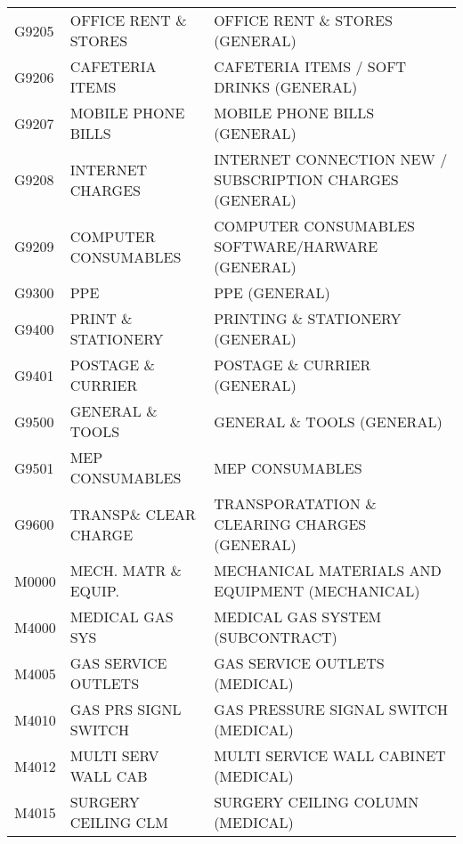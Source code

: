 \begin{longtable}[l]{l%
                  l|%
                  l|}
\rowcolor{thetableheadbgcolor!0.25!white} G9205       & OFFICE RENT \& STORES   & OFFICE RENT \& STORES (GENERAL)   \\
\rowcolor{thetableheadbgcolor!0.25!white} G9206       & CAFETERIA ITEMS   & CAFETERIA ITEMS / SOFT DRINKS (GENERAL)   \\
\rowcolor{thetableheadbgcolor!0.25!white} G9207       & MOBILE PHONE BILLS   & MOBILE PHONE BILLS (GENERAL)   \\
\rowcolor{thetableheadbgcolor!0.25!white} G9208       & INTERNET CHARGES   & INTERNET CONNECTION NEW / SUBSCRIPTION CHARGES  (GENERAL)   \\
\rowcolor{thetableheadbgcolor!0.25!white} G9209       & COMPUTER CONSUMABLES   & COMPUTER CONSUMABLES SOFTWARE/HARWARE (GENERAL)   \\
\rowcolor{thetableheadbgcolor!0.25!white} G9300       & PPE   & PPE (GENERAL)   \\
\rowcolor{thetableheadbgcolor!0.25!white} G9400       & PRINT \& STATIONERY   & PRINTING \& STATIONERY (GENERAL)   \\
\rowcolor{thetableheadbgcolor!0.25!white} G9401       & POSTAGE \& CURRIER   & POSTAGE \& CURRIER (GENERAL)   \\
\rowcolor{thetableheadbgcolor!0.25!white} G9500       & GENERAL \& TOOLS   & GENERAL \& TOOLS (GENERAL)   \\
\rowcolor{thetableheadbgcolor!0.25!white} G9501       & MEP CONSUMABLES   & MEP CONSUMABLES   \\
\rowcolor{thetableheadbgcolor!0.25!white} G9600       & TRANSP\& CLEAR CHARGE   & TRANSPORATATION \& CLEARING CHARGES (GENERAL)   \\
\rowcolor{thetableheadbgcolor!0.25!white} M0000       & MECH. MATR \& EQUIP.   & MECHANICAL MATERIALS AND EQUIPMENT (MECHANICAL)   \\
\rowcolor{thetableheadbgcolor!0.25!white} M4000       & MEDICAL GAS SYS   & MEDICAL GAS SYSTEM (SUBCONTRACT)   \\
\rowcolor{thetableheadbgcolor!0.25!white} M4005       & GAS SERVICE OUTLETS   & GAS SERVICE OUTLETS (MEDICAL)   \\
\rowcolor{thetableheadbgcolor!0.25!white} M4010       & GAS PRS SIGNL SWITCH   & GAS PRESSURE SIGNAL SWITCH (MEDICAL)   \\
\rowcolor{thetableheadbgcolor!0.25!white} M4012       & MULTI SERV WALL CAB   & MULTI SERVICE WALL CABINET (MEDICAL)   \\
\rowcolor{thetableheadbgcolor!0.25!white} M4015       & SURGERY CEILING CLM   & SURGERY CEILING COLUMN (MEDICAL)   \\

\end{longtable}
